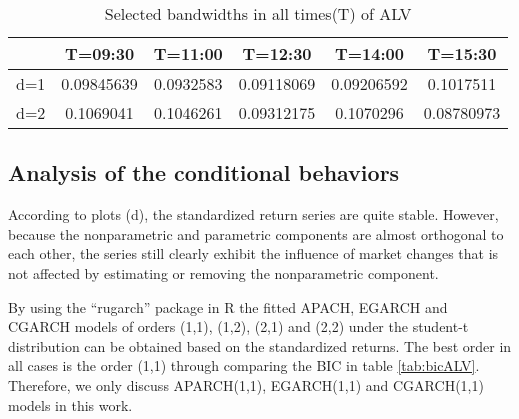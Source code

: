 \begin{table}[!h]
 \small
  \centering
  \vspace{2ex} 
\begin{tabular}{c|c|c|c|c|c}
\toprule
    &T=09:30&T=11:00&T=12:30&T=14:00&T=15:30 \\
\midrule
\hline
d=1	&0.09845639	& 0.0932583		&0.09118069	& 0.09206592  &	0.1017511\\
d=2	&0.1069041	& 0.1046261		&0.09312175	& 0.1070296	  &   0.08780973\\
\bottomrule

\end{tabular}
  \caption{Selected bandwidths in all times(T) of ALV}
  \label{tab:bandwidthALV}
\end{table}




\subsection{Analysis of the conditional behaviors}

According to plots (d), the standardized return series are quite stable. However, because the nonparametric and parametric components are almost orthogonal to each other, the series still clearly exhibit the influence of market changes that is not affected by estimating or removing the nonparametric component.

By using the ``rugarch'' package in R the fitted APACH, EGARCH and CGARCH models of orders (1,1), (1,2), (2,1) and (2,2) under the student-t distribution can be obtained based on the standardized returns. The best order in all cases is the order (1,1) through comparing the BIC in table \ref{tab:bicALV}. Therefore, we only discuss APARCH(1,1), EGARCH(1,1) and CGARCH(1,1) models in this work.




